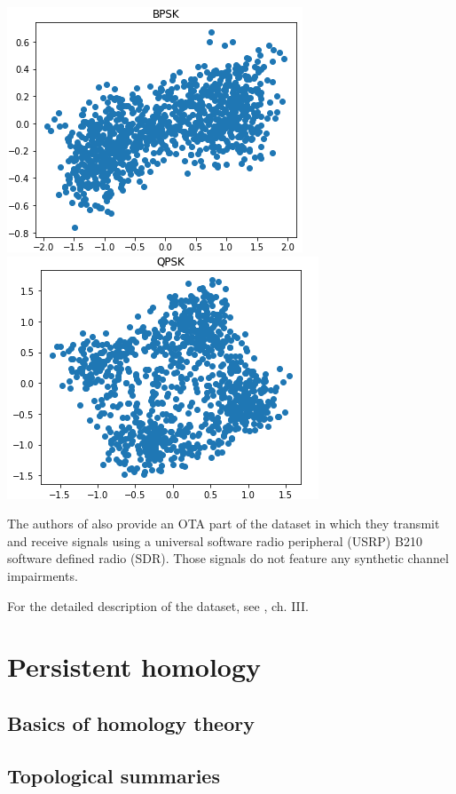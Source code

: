\documentclass[12pt]{article}
\theoremstyle{plain}
\theoremstyle{definition}
\theoremstyle{remark}
\begin{document}
	\includegraphics[scale=0.5]{BPSK.png}
	\includegraphics[scale=0.5]{QPSK.png}
	
	The authors of \cite{ORC} also provide an OTA part of the dataset in which they transmit and receive signals using a universal software radio peripheral (USRP) B210 software defined radio (SDR). Those signals do not feature any synthetic channel impairments.
		
	For the detailed description of the dataset, see \cite{ORC}, ch. III.
	
	\section{Persistent homology}
	
	\subsection{Basics of homology theory}
	
	\subsection{Topological summaries}
	
\end{document}
